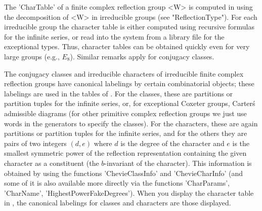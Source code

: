 \def\Sym{{\mathfrak S}}


The  'CharTable' of  a finite  complex reflection  group <W> is computed in
{\CHEVIE}  using  the  decomposition  of  <W>  in  irreducible  groups (see
"ReflectionType"). For each irreducible group the character table is either
computed using recursive formulas for the infinite series, or read into the
system  from  a  library  file  for  the exceptional types. Thus, character
tables  can be obtained  quickly even for  very large groups (e.g., $E_8$).
Similar remarks apply for conjugacy classes.

The  conjugacy  classes  and  irreducible  characters of irreducible finite
complex reflection groups have canonical labelings by certain combinatorial
objects;  these  labelings  are  used  in  the  tables  of \CHEVIE. For the
classes,  these are partitions or partition tuples for the infinite series,
or,   for  exceptional   Coxeter  groups,   Carter\'s  admissible  diagrams
\cite{Car72}  (for other  primitive complex  reflection groups  we just use
words  in the generators to specify the classes). For the characters, these
are  again partitions or partition tuples  for the infinite series, and for
the  others they are pairs of two  integers $(d,e)$ where $d$ is the degree
of  the character and $e$ is the smallest symmetric power of the reflection
representation  containing  the  given  character  as  a  constituent  (the
$b$-invariant  of the character). This information is obtained by using the
functions  'ChevieClassInfo' and 'ChevieCharInfo'  (and some of  it is also
available   more  directly  via  the  functions  'CharParams',  'CharName',
'HighestPowerFakeDegrees').  When you display the  character table in \GAP,
the canonical labelings for classes and characters are those displayed.

